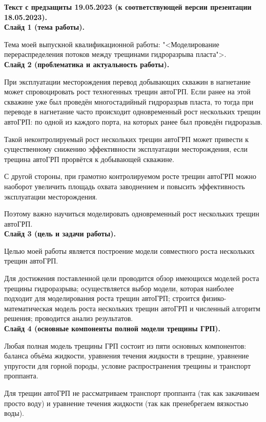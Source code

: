 \documentclass[a4paper, 12pt]{article}
\begin{document}
\textbf{\large Текст с предзащиты 19.05.2023 (к соответствующей версии презентации 18.05.2023).}\\

\textbf{Слайд 1 (тема работы).}

Тема моей выпускной квалификационной работы: "<Моделирование перераспределения потоков между трещинами гидроразрыва пласта">.\\

\textbf{Слайд 2 (проблематика и актуальность работы).}

При эксплуатации месторождения перевод добывающих скважин в нагнетание может спровоцировать рост техногенных трещин автоГРП.
Если ранее на этой скважине уже был проведён многостадийный гидроразрыв пласта, то тогда при переводе в нагнетание часто происходит одновременный рост нескольких трещин автоГРП: по одной из каждого порта, на которых ранее был проведён гидроразыв.

Такой неконтролируемый рост нескольких трещин автоГРП может привести к существенному снижению эффективности эксплуатации месторождения, если трещина автоГРП прорвётся к добывающей скважине.

С другой стороны, при грамотно контролируемом росте трещин автоГРП можно наоборот увеличить площадь охвата заводнением и повысить эффективность эксплуатации месторождения.

Поэтому важно научиться моделировать одновременный рост нескольких трещин автоГРП.\\ 

\textbf{Слайд 3 (цель и задачи работы).}

Целью моей работы является построение модели совместного роста нескольких трещин автоГРП.

Для достижения поставленной цели проводится обзор имеющихся моделей роста трещины гидроразрыва;
осуществляется выбор модели, которая наиболее подходит для моделирования роста трещин автоГРП;
строится физико-математическая модель роста нескольких трещин автоГРП и численный алгоритм решения;
проводится анализ результатов.\\

\textbf{Слайд 4 (основные компоненты полной модели трещины ГРП).}

Любая полная модель трещины ГРП состоит из пяти основных компонентов: баланса объёма жидкости, уравнения течения жидкости в трещине, уравнение упругости для горной породы, условие распространения трещины и транспорт проппанта.

Для трещин автоГРП не рассматриваем транспорт проппанта (так как закачиваем просто воду) и уравнение течения жидкости (так как пренебрегаем вязкостью воды).
\end{document}
